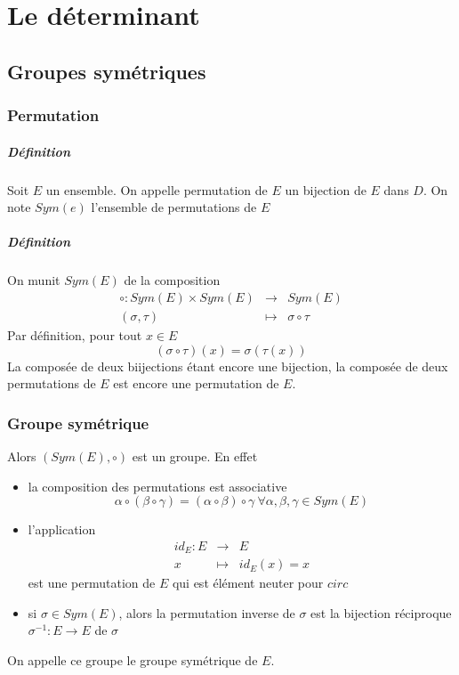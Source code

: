 \chapter{Le déterminant}

%
%
\section{Groupes symétriques}
%
%
%
\subsection{Permutation}
%
\paragraph{Définition} Soit $E$ un ensemble. On appelle permutation de $E$ un bijection  de $E$ dans $D$. On note $Sym(e)$ l'ensemble de permutations de $E$

\paragraph{Définition} On munit $Sym(E)$ de la composition
\begin{eqnarray*}
  \circ: Sym(E) \times Sym(E) &\rightarrow& Sym(E) \\
  (\sigma , \tau) &\mapsto& \sigma \circ \tau
\end{eqnarray*}
Par définition, pour tout $x\in E$
$$(\sigma \circ \tau)(x) = \sigma(\tau(x))$$
La composée de deux biijections étant encore une bijection, la composée de deux permutations de $E$ est encore une permutation de $E$.

%
\subsection{Groupe symétrique}
%
Alors $(Sym(E), \circ)$ est un groupe. En effet
\begin{itemize}
  \item la composition des permutations est associative
    $$\alpha \circ (\beta \circ \gamma) = (\alpha \circ \beta) \circ \gamma ~ \forall \alpha, \beta, \gamma \in Sym(E)$$
  
  \item l'application
    \begin{eqnarray*}
      id_E: E &\rightarrow& E \\
      x &\mapsto& id_E(x) = x 
    \end{eqnarray*}
    est une permutation de $E$ qui est élément neuter pour $circ$
    
  \item si $\sigma \in Sym(E)$, alors la permutation inverse de $\sigma$ est la bijection réciproque $\sigma^{-1}: E \rightarrow E$ de $\sigma$
\end{itemize}
On appelle ce groupe le groupe symétrique de $E$.

